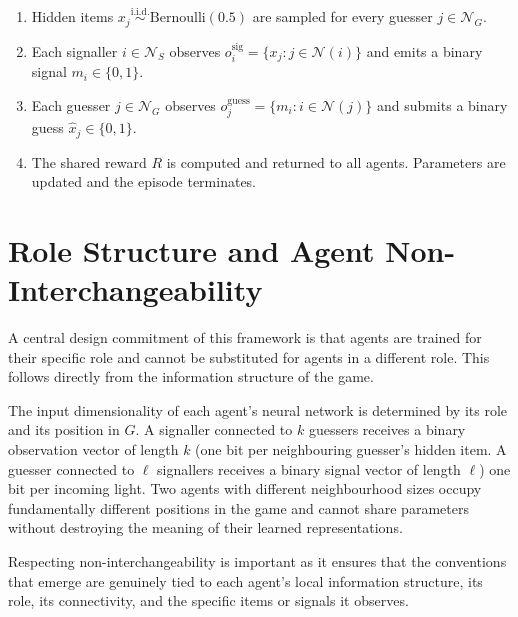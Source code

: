 \documentclass[a4paper,twoside,12pt]{report}
\begin{document}
    \begin{enumerate}
        \item Hidden items $x_j \overset{\text{i.i.d.}}{\sim}
        \mathrm{Bernoulli}(0.5)$ are sampled for every guesser $j \in
        \mathcal{N}_G$.
    
        \item Each signaller $i \in \mathcal{N}_S$ observes
        $o_i^{\mathrm{sig}} = \{x_j : j \in \mathcal{N}(i)\}$ and emits a
        binary signal $m_i \in \{0, 1\}$.
    
        \item Each guesser $j \in \mathcal{N}_G$ observes
        $o_j^{\mathrm{guess}} = \{m_i : i \in \mathcal{N}(j)\}$ and submits a
        binary guess $\hat{x}_j \in \{0, 1\}$.
    
        \item The shared reward $R$ is computed and returned to all agents.
        Parameters are updated and the episode terminates.
    \end{enumerate}
    
    
    
    \section{Role Structure and Agent Non-Interchangeability}
    \label{sec:roles}
    
    A central design commitment of this framework is that agents are trained for
    their specific role and cannot be substituted for agents in a different role.
    This follows directly from the information structure of the game.
    
    The input dimensionality of each agent's neural network is determined by its
    role and its position in $G$. A signaller connected to $k$ guessers receives a
    binary observation vector of length $k$ (one bit per neighbouring guesser's
    hidden item. A guesser connected to $\ell$ signallers receives a binary signal
    vector of length $\ell$) one bit per incoming light. Two agents with
    different neighbourhood sizes occupy fundamentally different positions in the
    game and cannot share parameters without destroying the meaning of their
    learned representations.
    
    Respecting non-interchangeability is important as it ensures that the conventions that emerge are genuinely tied to each agent's local information structure, its role, its connectivity, and the specific items or signals it observes.
    
\end{document}
